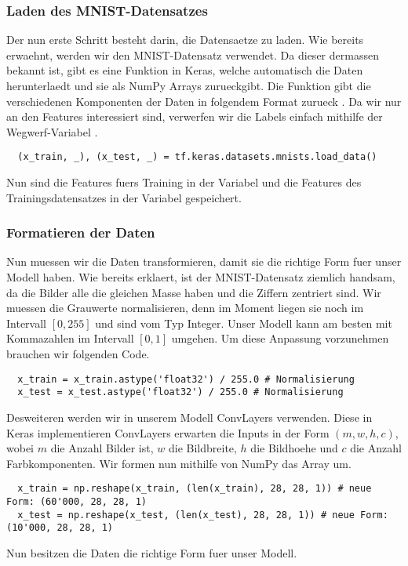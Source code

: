 \subsubsection{Laden des MNIST-Datensatzes}
Der nun erste Schritt besteht darin, die Datensaetze zu laden. Wie bereits
erwaehnt, werden wir den MNIST-Datensatz verwendet. Da dieser dermassen bekannt
ist, gibt es eine Funktion in Keras, welche automatisch die Daten herunterlaedt
und sie als NumPy Arrays zurueckgibt. Die Funktion gibt die verschiedenen
Komponenten der Daten in folgendem Format zurueck . Da wir nur an den Features  interessiert sind,
verwerfen wir die Labels  einfach mithilfe der Wegwerf-Variabel \code{\_}.
\begin{verbatim}
  (x_train, _), (x_test, _) = tf.keras.datasets.mnists.load_data()
\end{verbatim}
Nun sind die Features fuers Training in der Variabel  und die
Features des Trainingsdatensatzes in der Variabel  gespeichert.

\subsubsection{Formatieren der Daten}
Nun muessen wir die Daten transformieren, damit sie die richtige Form fuer
unser Modell haben. Wie bereits erklaert, ist der MNIST-Datensatz ziemlich
handsam, da die Bilder alle die gleichen Masse haben und die Ziffern zentriert sind.
\para{}
Wir muessen die Grauwerte normalisieren, denn im Moment liegen sie noch
im Intervall $[0, 255]$ und sind vom Typ Integer. Unser Modell kann am besten
mit Kommazahlen im Intervall $[0,1]$ umgehen. Um diese Anpassung vorzunehmen
brauchen wir folgenden Code.
\begin{verbatim}
  x_train = x_train.astype('float32') / 255.0 # Normalisierung
  x_test = x_test.astype('float32') / 255.0 # Normalisierung
\end{verbatim}
Desweiteren werden wir in unserem Modell ConvLayers verwenden. Diese in Keras
implementieren ConvLayers erwarten die Inputs in der Form $(m, w, h, c)$, wobei
$m$ die Anzahl Bilder ist, $w$ die Bildbreite, $h$ die Bildhoehe und $c$ die
Anzahl Farbkomponenten. Wir formen nun mithilfe von NumPy das Array um.
\begin{verbatim}
  x_train = np.reshape(x_train, (len(x_train), 28, 28, 1)) # neue Form: (60'000, 28, 28, 1)
  x_test = np.reshape(x_test, (len(x_test), 28, 28, 1)) # neue Form: (10'000, 28, 28, 1)
\end{verbatim}
Nun besitzen die Daten die richtige Form fuer unser Modell.

